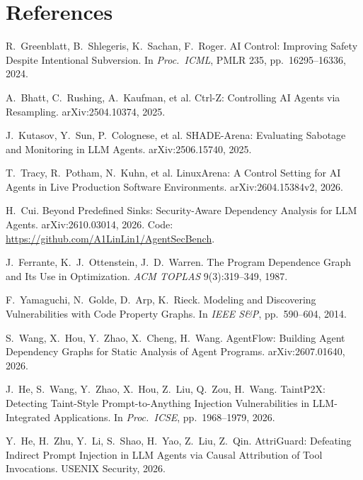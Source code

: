 \documentclass[11pt,letterpaper]{article}
\begin{document}
\section*{References}
\small
\begin{enumerate}[label={[\arabic*]},leftmargin=2em]
\item R.~Greenblatt, B.~Shlegeris, K.~Sachan, F.~Roger. AI Control: Improving Safety Despite Intentional Subversion. In \emph{Proc.\ ICML}, PMLR 235, pp.~16295--16336, 2024.
\item A.~Bhatt, C.~Rushing, A.~Kaufman, et al. Ctrl-Z: Controlling AI Agents via Resampling. arXiv:2504.10374, 2025.
\item J.~Kutasov, Y.~Sun, P.~Colognese, et al. SHADE-Arena: Evaluating Sabotage and Monitoring in LLM Agents. arXiv:2506.15740, 2025.
\item T.~Tracy, R.~Potham, N.~Kuhn, et al. LinuxArena: A Control Setting for AI Agents in Live Production Software Environments. arXiv:2604.15384v2, 2026.
\item H.~Cui. Beyond Predefined Sinks: Security-Aware Dependency Analysis for LLM Agents. arXiv:2610.03014, 2026. Code: \url{https://github.com/A1LinLin1/AgentSecBench}.
\item J.~Ferrante, K.~J.~Ottenstein, J.~D.~Warren. The Program Dependence Graph and Its Use in Optimization. \emph{ACM TOPLAS} 9(3):319--349, 1987.
\item F.~Yamaguchi, N.~Golde, D.~Arp, K.~Rieck. Modeling and Discovering Vulnerabilities with Code Property Graphs. In \emph{IEEE S\&P}, pp.~590--604, 2014.
\item S.~Wang, X.~Hou, Y.~Zhao, X.~Cheng, H.~Wang. AgentFlow: Building Agent Dependency Graphs for Static Analysis of Agent Programs. arXiv:2607.01640, 2026.
\item J.~He, S.~Wang, Y.~Zhao, X.~Hou, Z.~Liu, Q.~Zou, H.~Wang. TaintP2X: Detecting Taint-Style Prompt-to-Anything Injection Vulnerabilities in LLM-Integrated Applications. In \emph{Proc.\ ICSE}, pp.~1968--1979, 2026.
\item Y.~He, H.~Zhu, Y.~Li, S.~Shao, H.~Yao, Z.~Liu, Z.~Qin. AttriGuard: Defeating Indirect Prompt Injection in LLM Agents via Causal Attribution of Tool Invocations. USENIX Security, 2026.
\end{enumerate}
\end{document}
